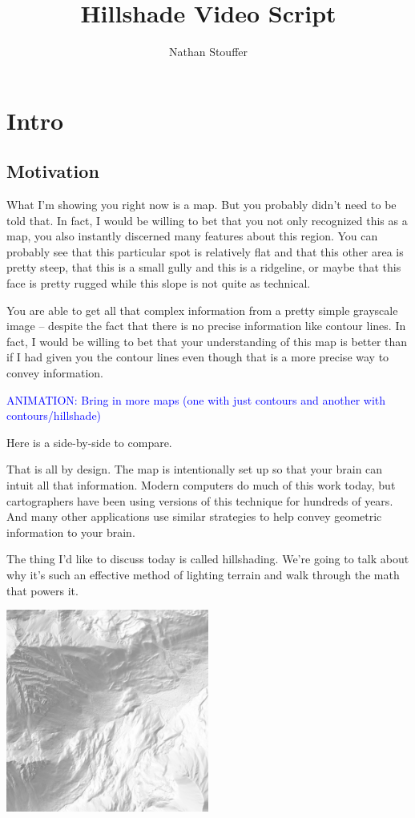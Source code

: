 \documentclass{article}
\newcommand\animation[1]{\textcolor{blue}{ANIMATION: #1}}
\begin{document}
	
\title{Hillshade Video Script}
\author{Nathan Stouffer}
\date{}
\maketitle

\section{Intro}

\subsection{Motivation}

What I'm showing you right now is a map.
But you probably didn't need to be told that.
In fact, I would be willing to bet that you not only recognized this as a map, you also instantly discerned many features about this region.
You can probably see that this particular spot is relatively flat and that this other area is pretty steep, that this is a small gully and this is a ridgeline, or maybe that this face is pretty rugged while this slope is not quite as technical.

You are able to get all that complex information from a pretty simple grayscale image -- despite the fact that there is no precise information like contour lines.
In fact, I would be willing to bet that your understanding of this map is better than if I had given you the contour lines even though that is a more precise way to convey information.

\animation{Bring in more maps (one with just contours and another with contours/hillshade)}

Here is a side-by-side to compare.

That is all by design.
The map is intentionally set up so that your brain can intuit all that information.
Modern computers do much of this work today, but cartographers have been using versions of this technique for hundreds of years.
And many other applications use similar strategies to help convey geometric information to your brain.

The thing I'd like to discuss today is called hillshading.
We're going to talk about why it's such an effective method of lighting terrain and walk through the math that powers it.

\begin{center}
	\includegraphics[width=0.5\textwidth,frame]{assets/hillshade-example.png}
\end{center}
\end{document}

